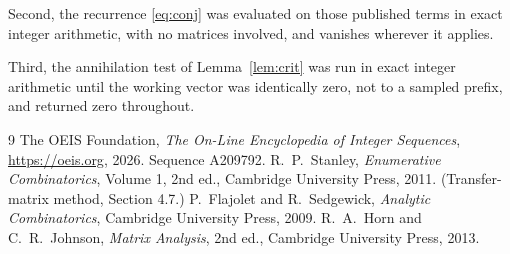 \documentclass[11pt,a4paper]{article}
\theoremstyle{plain}
\theoremstyle{definition}
\begin{document}
Second, the recurrence \eqref{eq:conj} was evaluated on those published terms in exact
integer arithmetic, with no matrices involved, and vanishes wherever it applies.

Third, the annihilation test of Lemma~\ref{lem:crit} was run in exact integer arithmetic
until the working vector was identically zero, not to a sampled prefix, and returned zero
throughout.

\begin{thebibliography}{9}
 The OEIS Foundation, \emph{The On-Line Encyclopedia of Integer
Sequences}, \url{https://oeis.org}, 2026. Sequence A209792.
 R.~P.~Stanley, \emph{Enumerative Combinatorics}, Volume 1, 2nd ed.,
Cambridge University Press, 2011. (Transfer-matrix method, Section 4.7.)
 P.~Flajolet and R.~Sedgewick, \emph{Analytic Combinatorics}, Cambridge
University Press, 2009.
 R.~A.~Horn and C.~R.~Johnson, \emph{Matrix Analysis}, 2nd ed., Cambridge
University Press, 2013.
\end{thebibliography}
\end{document}
